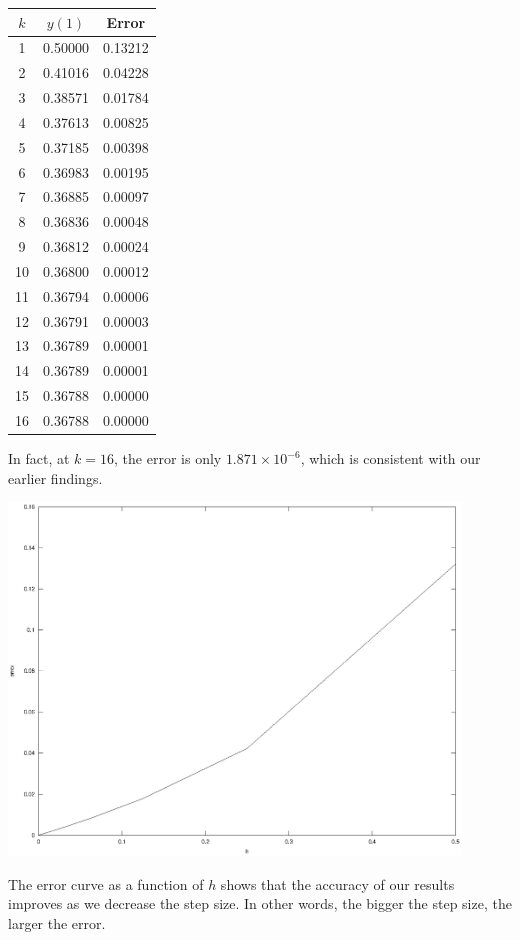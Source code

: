 \documentclass[11pt,a4paper]{article}
\begin{document}
\begin{enumerate}
	\begin{center}
		\begin{tabular}{|c|c|c|}
		\hline
		$k$ &$y(1)$ &Error \\
		\hline
		1 &0.50000 &0.13212 \\
		2 &0.41016 &0.04228 \\
		3 &0.38571 &0.01784 \\
		4 &0.37613 &0.00825 \\
		5 &0.37185 &0.00398 \\
		6 &0.36983 &0.00195 \\
		7 &0.36885 &0.00097 \\
		8 &0.36836 &0.00048 \\
		9 &0.36812 &0.00024 \\
		10 &0.36800 &0.00012 \\
		11 &0.36794 &0.00006 \\
		12 &0.36791 &0.00003 \\
		13 &0.36789 &0.00001 \\
		14 &0.36789 &0.00001 \\
		15 &0.36788 &0.00000  \\
		16 &0.36788 &0.00000  \\
		\hline
		\end{tabular}
	\end{center}
	
	In fact, at $k=16$, the error is only $1.871 \times 10^{-6}$, which is consistent with our earlier findings. 
	\begin{center}
		\includegraphics[width=0.9\textwidth]{err1.eps}
	\end{center}
	The error curve as a function of $h$ shows that the accuracy of our results improves as we decrease the step size. In other words, the bigger the step size, the larger the error.
	

\end{enumerate}
\end{document}
